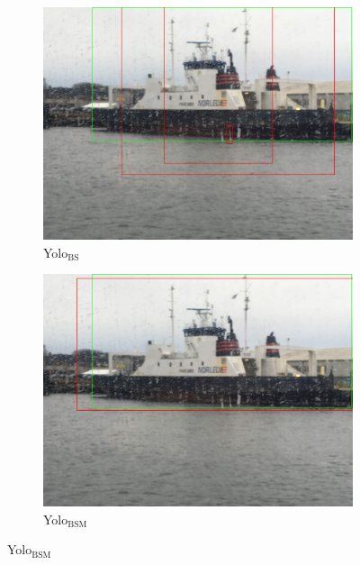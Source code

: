 \begin{figure}[h!]
\begin{subfigure}{.5\textwidth}
  \centering
  \includegraphics[width=0.8\linewidth]{results/case_tr_moor/yolo12/yolo1/2better/IMG_2574.jpg}
  \caption{Yolo$_{\text{BS}}$}
\end{subfigure}%
\begin{subfigure}{.5\textwidth}
  \centering
  \includegraphics[width=.8\linewidth]{results/case_tr_moor/yolo12/yolo2/2better/IMG_2574.jpg}
  \caption{Yolo$_{\text{BSM}}$}
\end{subfigure}


\end{figure}
